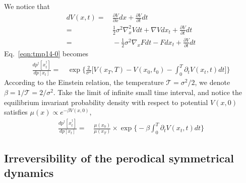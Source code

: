 \documentclass[aps, pre, preprint,unsortedaddress,a4paper,onecolumn]{revtex4}
\begin{document}
We notice that
\begin{align}\nonumber
  dV(x, t) = &\, \frac{\partial V}{\partial x} dx + \frac{\partial V}{\partial t} dt\\\nonumber
  =&\,
  \frac12 \sigma^2 \nabla^2_x V dt +  \nabla V dx_t + \frac{\partial V}{\partial t} dt \\
  =&\,
  -\frac12 \sigma^2 \nabla_x F dt -  F dx_t + \frac{\partial V}{\partial t} dt
\end{align}
Eq.~\eqref{eqn:tmp14-0} becomes
\begin{align}
  \frac{  dp^\dagger[x^\dagger_t] }{ dp[x_t]}
  =&\,
  \exp\bigg\{
  \frac2{\sigma^2}\bigg[
  V(x_T,T) - V(x_0,t_0) - \int_0^T\partial_tV(x_t,t)dt
  \bigg]
  \bigg\}
\end{align}
According to the  Einstein relation, the temperature $\mathcal T = \sigma^2/2$, we denote $\beta = 1/{\mathcal T} = 2/\sigma^2$.
Take the limit of infinite small time interval, and notice the equilibrium
invariant probability density with respect to potential $V(x,0)$ satisfies $\mu(x) \propto e^{-\beta V(x,0)}$,
\begin{align}
  \frac{  dp^\dagger[x^\dagger_t] }{ dp[x_t]}
  =&\,
  \frac{\mu(x_0)}{\mu(x_T)}\times
  \exp\bigg\{
  - \beta\int_0^T\partial_tV(x_t,t)dt
  \bigg\}
\end{align}

\subsection{Irreversibility of the perodical symmetrical dynamics}
\end{document}
